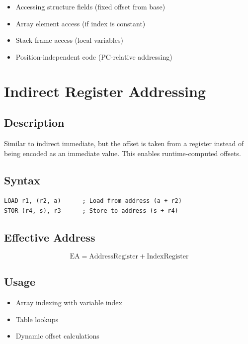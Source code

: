 \begin{itemize}
	\item Accessing structure fields (fixed offset from base)
	\item Array element access (if index is constant)
	\item Stack frame access (local variables)
	\item Position-independent code (PC-relative addressing)
\end{itemize}

\section{Indirect Register Addressing}

\subsection{Description}

Similar to indirect immediate, but the offset is taken from a register instead of being encoded as an immediate value.
This enables runtime-computed offsets.

\subsection{Syntax}

\begin{lstlisting}
LOAD r1, (r2, a)      ; Load from address (a + r2)
STOR (r4, s), r3      ; Store to address (s + r4)
\end{lstlisting}

\subsection{Effective Address}

\begin{equation}
	\text{EA} = \text{AddressRegister} + \text{IndexRegister}
\end{equation}

\subsection{Usage}

\begin{itemize}
	\item Array indexing with variable index
	\item Table lookups
	\item Dynamic offset calculations
\end{itemize}

